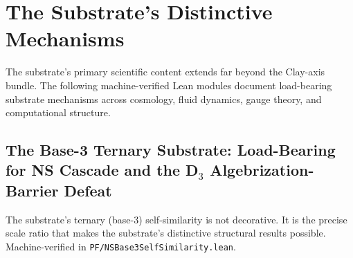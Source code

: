 \documentclass[11pt,a4paper]{amsart}
\theoremstyle{plain}
\theoremstyle{definition}
\begin{document}
\section{The Substrate's Distinctive Mechanisms}\label{sec:distinctive-mechanisms}

The substrate's primary scientific content extends far beyond the Clay-axis bundle. The following machine-verified Lean modules document load-bearing substrate mechanisms across cosmology, fluid dynamics, gauge theory, and computational structure.

\subsection{The Base-3 Ternary Substrate: Load-Bearing for NS Cascade and the D\texorpdfstring{$_3$}{3} Algebrization-Barrier Defeat}\label{subsec:base3-ternary}

The substrate's ternary (base-3) self-similarity is not decorative. It is the precise scale ratio that makes the substrate's distinctive structural results possible. Machine-verified in \texttt{PF/NSBase3SelfSimilarity.lean}.
\end{document}
